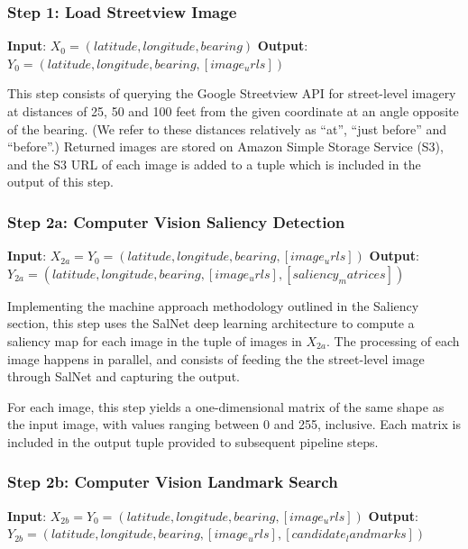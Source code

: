 \subsubsection*{Step 1: Load Streetview Image}
\textbf{Input}: $X_0 = (latitude, longitude, bearing)$
\textbf{Output}: $Y_0 = (latitude, longitude, bearing, [image_urls])$

This step consists of querying the Google Streetview API for street-level imagery at distances of 25, 50 and 100 feet from the given coordinate at an angle opposite of the bearing. (We refer to these distances relatively as “at”, “just before” and “before”.) Returned images are stored on Amazon Simple Storage Service (S3), and the S3 URL of each image is added to a tuple which is included in the output of this step. 

\subsubsection*{Step 2a: Computer Vision Saliency Detection}
\textbf{Input}: $X_{2a} = Y_0 = (latitude, longitude, bearing, [image_urls])$
\textbf{Output}: $Y_{2a} = (latitude, longitude, bearing, [image_urls], [saliency_matrices])$ 

Implementing the machine approach methodology outlined in the Saliency section, this step uses the SalNet deep learning architecture to compute a saliency map for each image in the tuple of images in $X_{2a}$. The processing of each image happens in parallel, and consists of feeding the the street-level image through SalNet and capturing the output.

For each image, this step yields a one-dimensional matrix of the same shape as the input image, with values ranging between 0 and 255, inclusive. Each matrix is included in the output tuple provided to subsequent pipeline steps.

\subsubsection*{Step 2b: Computer Vision Landmark Search}
\textbf{Input}: $X_{2b} = Y_0 = (latitude, longitude, bearing, [image_urls])$
\textbf{Output}: $Y_{2b} = (latitude, longitude, bearing,  [image_urls], [candidate_landmarks] )$ 

